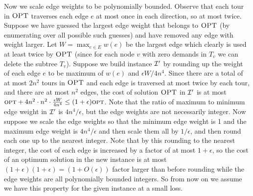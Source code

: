\documentclass[twoside,leqno]{article}
\newcommand{\calI}{{\cal I}}
\newcommand{\opt}{\mbox{\sc opt}}
\newcommand{\OPT}{\mbox{\sc OPT}}
\newcommand{\eps}{\epsilon}
\begin{document}
Now we scale edge weights to be polynomially bounded.
Observe that each tour in $\OPT$ traverses each edge $e$ at most once in each direction, so at most twice. 
Suppose we have guessed the largest edge weight that belongs to $\OPT$ (by enumerating over all possible such guesses) and have removed any edge with weight larger. Let $W=\max_{e\in E} w(e)$ be the largest edge which clearly is used at least twice by $\OPT$ (since for each node $v$ with zero demands in $T_v$ we can delete the subtree $T_v$).
Suppose we build instance $\calI'$ by rounding up the weight of each edge $e$ to be maximum of
$w(e)$ and $\eps W/4n^4$. Since there are a total of at most $2n^2$ tours in $\OPT$ and each edge
is traversed at most twice by each tour, and there are at most $n^2$ edges,
the cost of solution $\OPT$ in $\calI'$ is at most
$\opt+4n^2\cdot n^2\cdot\frac{\eps W}{4n^4} \leq (1+\eps )\opt$. Note that the ratio of maximum to minimum edge weight in $\calI'$ is $4n^4/\eps$, but the edge weights are not necessarily integer.
Now suppose we scale the edge weights so that the minimum edge weight is 1 and the maximum edge weight is $4n^4/\eps$ and
then scale them all by $1/\eps$, and then round each one up to the nearest integer.
Note that by this rounding to the nearest integer, 
the cost of each edge is increased by a factor of at most $1+\eps$, so the cost of an optimum solution in
the new instance is at most $(1+\eps)(1+\eps)=(1+O(\eps))$ factor larger than before rounding while the edge weights are all polynomially bounded integers.
So from now on we assume we have this property for the given instance at a small loss.
\end{document}
